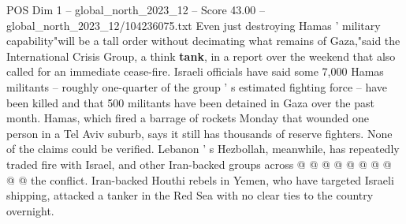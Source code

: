 \begin{textsample}{POS Dim 1 – global\_north\_2023\_12 – Score 43.00 – global\_north\_2023\_12/104236075.txt}
Even just destroying Hamas ' military capability"will be a tall order without decimating what remains of Gaza,"said the International Crisis Group, a think \textbf{tank}, in a report over the weekend that also called for an immediate cease-fire.
Israeli officials have said some 7,000 Hamas militants -- roughly one-quarter of the group ' s estimated fighting force -- have been killed and that 500 militants have been detained in Gaza over the past month.
Hamas, which fired a barrage of rockets Monday that wounded one person in a Tel Aviv suburb, says it still has thousands of reserve fighters.
None of the claims could be verified.
Lebanon ' s Hezbollah, meanwhile, has repeatedly traded fire with Israel, and other Iran-backed groups across @ @ @ @ @ @ @ @ @ @ the conflict.
Iran-backed Houthi rebels in Yemen, who have targeted Israeli shipping, attacked a tanker in the Red Sea with no clear ties to the country overnight.

\end{textsample}
